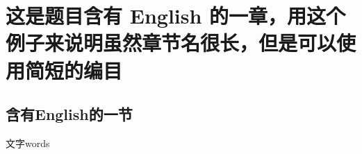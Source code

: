 \chapter[含 English 的标题]{这是题目含有 English 的一章，用这个例子来说明虽然章节名很长，但是可以使用简短的编目}
\section[同理节亦然]{含有English的一节}
文字words